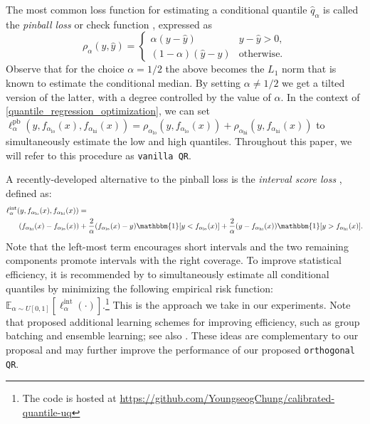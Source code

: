 \documentclass{article}
\begin{document}
The most common loss function for estimating a conditional quantile $\hat{q}_\alpha$ is called the \emph{pinball loss} or check function \cite{QR, quantile_regression, estimating_cond_quantiles_pinball}, expressed as
\begin{equation}
\rho_\alpha(y,\hat{y}) = 
\begin{cases} 
      \alpha(y-\hat{y}) & y-\hat{y} > 0, \\
      (1-\alpha)(\hat{y}-y) & \textrm{otherwise}.
   \end{cases}
\end{equation}
Observe that for the choice $\alpha=1/2$ the above becomes the $L_1$ norm that is known to estimate the conditional median. By setting $\alpha \neq 1/2$ we get a tilted version of the latter, with a degree controlled by the value of $\alpha$. In the context of \eqref{quantile_regression_optimization}, we can set $\ell^\textrm{pb}_{\alpha}(y,f_{\alpha_{\textrm{lo}}}(x), f_{\alpha_{\textrm{hi}}}(x)) = \rho_{\alpha_{\textrm{lo}}}(y,f_{\alpha_{\textrm{lo}}}(x)) + \rho_{\alpha_{\textrm{hi}}}(y,f_{\alpha_{\textrm{hi}}}(x))$ to simultaneously estimate the low and high quantiles. Throughout this paper, we will refer to this procedure as \texttt{vanilla QR}. 

A recently-developed alternative to the pinball loss is the \emph{interval score loss} \cite{interval_score_loss}, defined as:
\begin{align}
& \ell^\textrm{int}_{\alpha}(y,f_{\alpha_{\textrm{lo}}}(x), f_{\alpha_{\textrm{hi}}}(x)) = \nonumber \\ 
&  \ \ \ \ \ (f_{\alpha_{\textrm{hi}}}(x) - f_{\alpha_{\textrm{lo}}}(x)) + \frac{2}{\alpha}(f_{\alpha_{\textrm{lo}}}(x) - y) \mathbbm{1}[y < f_{\alpha_{\textrm{lo}}}(x)]
+ \frac{2}{\alpha}(y - f_{\alpha_{\textrm{hi}}}(x)) \mathbbm{1}[ y > f_{\alpha_{\textrm{hi}}}(x)].
\end{align}
Note that the left-most term encourages short intervals and the two remaining components promote intervals with the right coverage. To improve statistical efficiency, it is recommended by \cite{beyond_pinball_loss} to simultaneously estimate all conditional quantiles by minimizing the following empirical risk function: $\mathbb{E}_{\alpha \sim U[0,1]}[\ell^\textrm{int}_{\alpha}(\cdot)]$.\footnote{The code is hosted at \url{https://github.com/YoungseogChung/calibrated-quantile-uq}} This is the approach we take in our experiments. Note that \cite{beyond_pinball_loss} proposed additional learning schemes for improving efficiency, such as group batching and ensemble learning; see also \cite{ENS_QR}. These ideas are complementary to our proposal and may further improve the performance of our proposed \texttt{orthogonal QR}.
\end{document}

